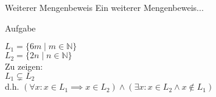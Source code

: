 %
%
%
%

\begin{frame}{Weiterer Mengenbeweis}
    Ein weiterer Mengenbeweis...
    \begin{block}{\alert{Aufgabe}}
    
    $L_1=\{6m \mid m \in \mathbb{N}\}$\\
    $L_2=\{2n \mid n \in \mathbb{N}\}$\\
    Zu zeigen:\\
    $L_1 \subsetneq L_2$\\
    d.h. $(\forall x: x \in L_1 \implies x \in L_2) \wedge (\exists x: x \in L_2 \land x \notin L_1)$
    
   
   

\end{block}

\end{frame}

